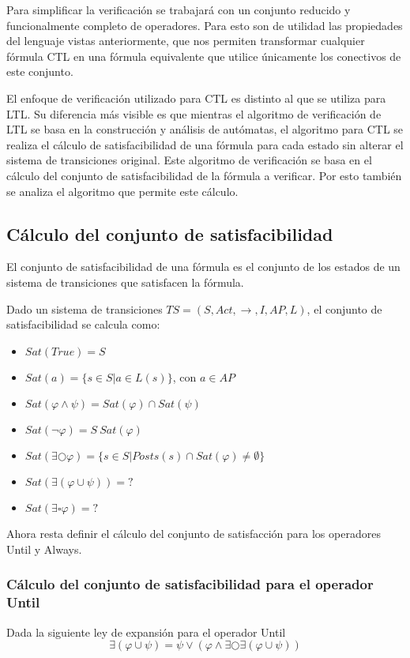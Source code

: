 Para simplificar la verificación se trabajará con un conjunto reducido y funcionalmente
 completo de operadores. Para esto son de utilidad las propiedades del lenguaje vistas
 anteriormente, que nos permiten transformar cualquier fórmula CTL en una fórmula
 equivalente que utilice únicamente los conectivos de este conjunto.

El enfoque de verificación utilizado para CTL es distinto al que se utiliza para LTL.
Su diferencia más visible es que mientras el algoritmo de verificación de LTL se basa
 en la construcción y análisis de autómatas, el algoritmo para CTL se realiza el
 cálculo de satisfacibilidad de una fórmula para cada estado sin alterar el sistema
 de transiciones original.
Este algoritmo de verificación se basa en el cálculo del conjunto de satisfacibilidad
 de la fórmula a verificar.
Por esto también se analiza el algoritmo que permite este cálculo.



\subsection{Cálculo del conjunto de satisfacibilidad}
El conjunto de satisfacibilidad de una fórmula es el conjunto
 de los estados de un sistema de transiciones que satisfacen la fórmula.

Dado un sistema de transiciones $TS = (S, Act, \rightarrow, I, AP, L)$, el conjunto de
 satisfacibilidad se calcula como:
\begin{itemize}
\item $Sat(True) = S$
\item $Sat(a) = \{ s \in S | a \in L(s) \}$, con $a \in AP$
\item $Sat(\varphi \wedge \psi) = Sat(\varphi) \cap Sat(\psi)$
\item $Sat(\neg \varphi) = S \ Sat(\varphi)$
\item $Sat(\exists \bigcirc \varphi) = \{ s \in S | Posts(s) \cap Sat(\varphi) \neq \emptyset \}$
\item $Sat(\exists (\varphi \cup \psi)) = ? $
\item $Sat(\exists \square \varphi) = ? $

\end{itemize}

Ahora resta definir el cálculo del conjunto de satisfacción para los operadores Until y Always.

\subsubsection{Cálculo del conjunto de satisfacibilidad para el operador Until}
Dada la siguiente ley de expansión para el operador Until
\[
\exists (\varphi \cup \psi) = \psi \lor (\varphi \land \exists \bigcirc \exists (\varphi \cup \psi))
\]

